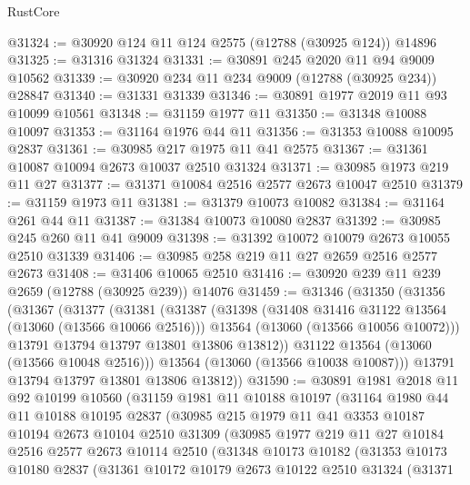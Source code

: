 \begin{lexlean}{RustCore}
\begin{coremodule}
@31324 := @30920 @124 @11 @124 @2575 (@12788 (@30925 @124)) @14896
@31325 := @31316 @31324
@31331 := @30891 @245 @2020 @11 @94 @9009 @10562
@31339 := @30920 @234 @11 @234 @9009 (@12788 (@30925 @234)) @28847
@31340 := @31331 @31339
@31346 := @30891 @1977 @2019 @11 @93 @10099 @10561
@31348 := @31159 @1977 @11
@31350 := @31348 @10088 @10097
@31353 := @31164 @1976 @44 @11
@31356 := @31353 @10088 @10095 @2837
@31361 := @30985 @217 @1975 @11 @41 @2575
@31367 := @31361 @10087 @10094 @2673 @10037 @2510 @31324
@31371 := @30985 @1973 @219 @11 @27
@31377 := @31371 @10084 @2516 @2577 @2673 @10047 @2510
@31379 := @31159 @1973 @11
@31381 := @31379 @10073 @10082
@31384 := @31164 @261 @44 @11
@31387 := @31384 @10073 @10080 @2837
@31392 := @30985 @245 @260 @11 @41 @9009
@31398 := @31392 @10072 @10079 @2673 @10055 @2510 @31339
@31406 := @30985 @258 @219 @11 @27 @2659 @2516 @2577 @2673
@31408 := @31406 @10065 @2510
@31416 := @30920 @239 @11 @239 @2659 (@12788 (@30925 @239)) @14076
@31459 := @31346
    (@31350
      (@31356
        (@31367
          (@31377
            (@31381
              (@31387
                (@31398
                  (@31408 @31416 @31122 @13564 (@13060 (@13566 @10066 @2516)))
                  @13564
                  (@13060 (@13566 @10056 @10072)))
                @13791
                @13794
                @13797
                @13801
                @13806
                @13812))
            @31122
            @13564
            (@13060 (@13566 @10048 @2516)))
          @13564
          (@13060 (@13566 @10038 @10087)))
        @13791
        @13794
        @13797
        @13801
        @13806
        @13812))
@31590 := @30891
    @1981
    @2018
    @11
    @92
    @10199
    @10560
    (@31159
      @1981
      @11
      @10188
      @10197
      (@31164
        @1980
        @44
        @11
        @10188
        @10195
        @2837
        (@30985
          @215
          @1979
          @11
          @41
          @3353
          @10187
          @10194
          @2673
          @10104
          @2510
          @31309
          (@30985
            @1977
            @219
            @11
            @27
            @10184
            @2516
            @2577
            @2673
            @10114
            @2510
            (@31348
              @10173
              @10182
              (@31353
                @10173
                @10180
                @2837
                (@31361
                  @10172
                  @10179
                  @2673
                  @10122
                  @2510
                  @31324
                  (@31371

\end{coremodule}
\end{lexlean}
